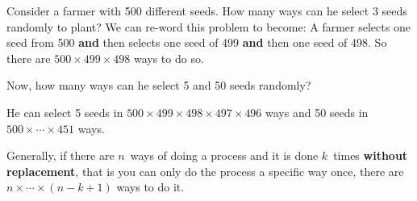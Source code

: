 \begin{example}
Consider a farmer with 500 different seeds. How many ways can he select 3 seeds randomly to plant?
\tcblower
We can re-word this problem to become: A farmer selects one seed from 500 \textbf{and} then selects one seed of 499 \textbf{and} then one seed of 498. So there are $500 \times 499 \times 498$ ways to do so.
\par\bigskip
Now, how many ways can he select 5 and 50 seeds randomly?
\par\medskip
He can select 5 seeds in $500 \times 499 \times 498 \times 497 \times 496$ ways and 50 seeds in $500 \times \cdots \times 451$ ways.
\end{example}
\begin{info}
Generally, if there are $n$~ways of doing a process and it is done $k$~times \textbf{without replacement}, that is you can only do the process a specific way once, there are $n \times \cdots \times (n-k+1)$ ways to do it.
\end{info}
